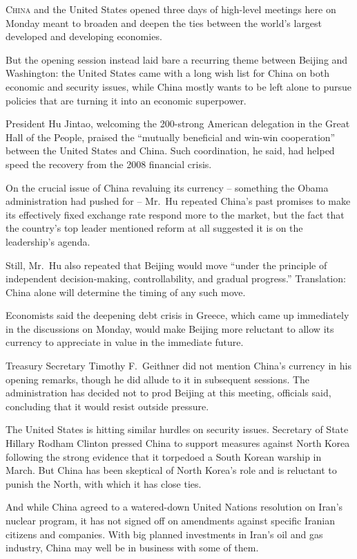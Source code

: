 ﻿\documentclass[12pt]{article}
\begin{document}
\lettrine{C}{hina} and the United States opened three days of high-level
meetings here on Monday meant to broaden and deepen the ties between the world's largest developed
and developing economies.

But the opening session instead laid bare a recurring theme between Beijing and Washington: the
United States came with a long wish list for China on both economic and security issues, while China
mostly wants to be left alone to pursue policies that are turning it into an economic superpower.

President Hu Jintao, welcoming the 200-strong American delegation in the Great Hall of the People,
praised the ``mutually beneficial and win-win cooperation'' between the United States and China.
Such coordination, he said, had helped speed the recovery from the 2008 financial crisis.

On the crucial issue of China revaluing its currency -- something the Obama administration had
pushed for -- Mr.~Hu repeated China's past promises to make its effectively fixed exchange rate
respond more to the market, but the fact that the country's top leader mentioned reform at all
suggested it is on the leadership's agenda.

Still, Mr.~Hu also repeated that Beijing would move ``under the principle of independent
decision-making, controllability, and gradual progress.'' Translation: China alone will determine
the timing of any such move.

Economists said the deepening debt crisis in Greece, which came up immediately in the discussions on
Monday, would make Beijing more reluctant to allow its currency to appreciate in value in the
immediate future.

Treasury Secretary Timothy F.~Geithner did not mention China's currency in his opening remarks,
though he did allude to it in subsequent sessions. The administration has decided not to prod
Beijing at this meeting, officials said, concluding that it would resist outside pressure.

The United States is hitting similar hurdles on security issues. Secretary of State Hillary Rodham
Clinton pressed China to support measures against North Korea following the strong evidence that it
torpedoed a South Korean warship in March. But China has been skeptical of North Korea's role and is
reluctant to punish the North, with which it has close ties.

And while China agreed to a watered-down United Nations resolution on Iran's nuclear program, it has
not signed off on amendments against specific Iranian citizens and companies. With big planned
investments in Iran's oil and gas industry, China may well be in business with some of them.
\end{document}
